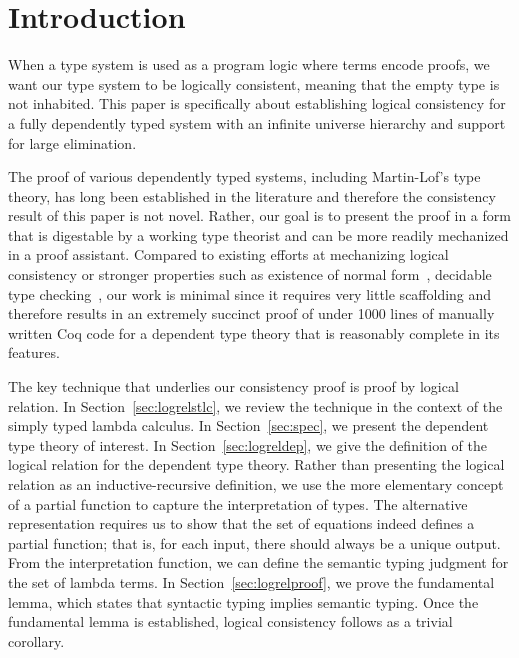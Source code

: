 \documentclass[nonacm]{acmart}
\begin{document}
\section{Introduction}
When a type system is used as a program logic where terms encode proofs, we
want our type system to be logically consistent, meaning
that the empty type is not inhabited.
This paper is specifically
about establishing logical consistency for a fully dependently typed
system with an infinite universe hierarchy and support for large
elimination. %

The proof of various dependently typed systems, including Martin-Lof's
type theory, has long been
established in the literature and therefore the consistency result of
this paper is not novel. Rather,
our goal is to present the proof in a form that is digestable by a
working type theorist and can be more readily mechanized in a proof
assistant. Compared to existing efforts at mechanizing logical
consistency or stronger properties such as existence of normal
form~\citep{nbeincoq},
decidable type checking~\citep{decagda}, our work is minimal since it requires very
little scaffolding and therefore results in an extremely succinct
proof of under 1000 lines of manually written Coq code for a dependent
type theory that is reasonably complete in its features.

The key technique that underlies our consistency proof is proof by
logical relation. In Section~\ref{sec:logrelstlc}, we review the
technique in the context of the simply typed lambda calculus. In
Section~\ref{sec:spec}, we present the dependent type theory of
interest. In Section~\ref{sec:logreldep}, we give the definition
of the logical relation for the dependent type theory. Rather than
presenting the logical relation as an inductive-recursive definition,
we use the more elementary concept of a partial function to capture
the interpretation of types. The alternative representation requires us
to show that the set of equations indeed defines a partial function;
that is, for each input, there should always be a unique
output.
From the interpretation function, we can define the semantic
typing judgment for the set of lambda terms.
In Section~\ref{sec:logrelproof}, we prove the fundamental lemma,
which states that syntactic typing implies semantic typing. Once the
fundamental lemma is established, logical consistency follows as a
trivial corollary.
\end{document}
